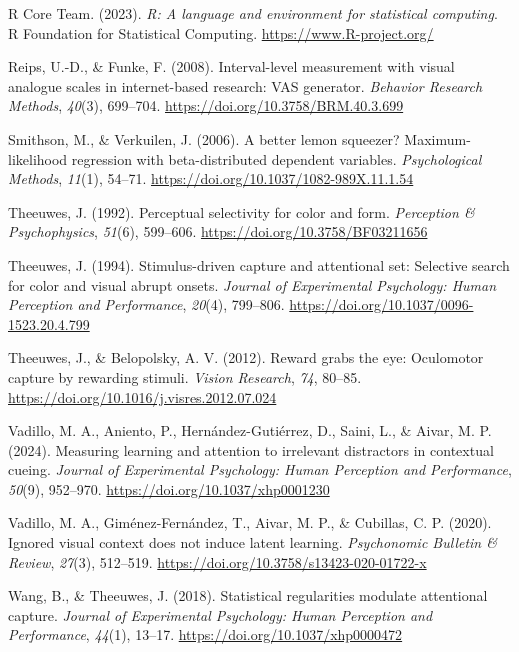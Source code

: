 \documentclass[
  man,
  floatsintext,
  longtable,
  nolmodern,
  notxfonts,
  notimes,
  colorlinks=true,linkcolor=blue,citecolor=blue,urlcolor=blue]{apa7}
\newlength{\cslhangindent}
\newenvironment{CSLReferences}[2] %
 {\begin{list}{}{%
  \setlength{\itemindent}{0pt}
  \setlength{\leftmargin}{0pt}
  \setlength{\parsep}{0pt}
  \ifodd #1
   \setlength{\leftmargin}{\cslhangindent}
   \setlength{\itemindent}{-1\cslhangindent}
  \fi
  \setlength{\itemsep}{#2\baselineskip}}}
 {\end{list}}
\begin{document}
\begin{CSLReferences}{1}{0}
R Core Team. (2023). \emph{R: A language and environment for statistical
computing}. R Foundation for Statistical Computing.
\url{https://www.R-project.org/}

Reips, U.-D., \& Funke, F. (2008). Interval-level measurement with
visual analogue scales in internet-based research: VAS generator.
\emph{Behavior Research Methods}, \emph{40}(3), 699--704.
\url{https://doi.org/10.3758/BRM.40.3.699}

Smithson, M., \& Verkuilen, J. (2006). A better lemon squeezer?
Maximum-likelihood regression with beta-distributed dependent variables.
\emph{Psychological Methods}, \emph{11}(1), 54--71.
\url{https://doi.org/10.1037/1082-989X.11.1.54}

Theeuwes, J. (1992). Perceptual selectivity for color and form.
\emph{Perception \& Psychophysics}, \emph{51}(6), 599--606.
\url{https://doi.org/10.3758/BF03211656}

Theeuwes, J. (1994). Stimulus-driven capture and attentional set:
Selective search for color and visual abrupt onsets. \emph{Journal of
Experimental Psychology: Human Perception and Performance},
\emph{20}(4), 799--806. \url{https://doi.org/10.1037/0096-1523.20.4.799}

Theeuwes, J., \& Belopolsky, A. V. (2012). Reward grabs the eye:
Oculomotor capture by rewarding stimuli. \emph{Vision Research},
\emph{74}, 80--85. \url{https://doi.org/10.1016/j.visres.2012.07.024}

Vadillo, M. A., Aniento, P., Hernández-Gutiérrez, D., Saini, L., \&
Aivar, M. P. (2024). Measuring learning and attention to irrelevant
distractors in contextual cueing. \emph{Journal of Experimental
Psychology: Human Perception and Performance}, \emph{50}(9), 952--970.
\url{https://doi.org/10.1037/xhp0001230}

Vadillo, M. A., Giménez-Fernández, T., Aivar, M. P., \& Cubillas, C. P.
(2020). Ignored visual context does not induce latent learning.
\emph{Psychonomic Bulletin \& Review}, \emph{27}(3), 512--519.
\url{https://doi.org/10.3758/s13423-020-01722-x}

Wang, B., \& Theeuwes, J. (2018). Statistical regularities modulate
attentional capture. \emph{Journal of Experimental Psychology: Human
Perception and Performance}, \emph{44}(1), 13--17.
\url{https://doi.org/10.1037/xhp0000472}


\end{CSLReferences}
\end{document}
